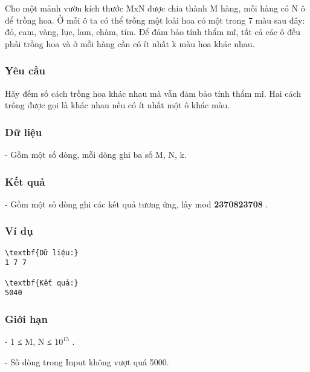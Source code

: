 







   Cho một mảnh vườn kích thước MxN được chia thành M hàng, mỗi hàng có N ô để trồng hoa. Ở mỗi ô ta có thể trồng một loài hoa có một trong 7 màu sau đây: đỏ, cam, vàng, lục, lam, chàm, tím. Để đảm bảo tính thẩm mĩ, tất cả các ô đều phải trồng hoa và ở mỗi hàng cần có ít nhất k màu hoa khác nhau.  

\subsubsection{   Yêu cầu  }

   Hãy đếm số cách trồng hoa khác nhau mà vẫn đảm bảo tính thẩm mĩ. Hai cách trồng được gọi là khác nhau nếu có ít nhất một ô khác màu.  

\subsubsection{   Dữ liệu  }

   - Gồm một số dòng, mỗi dòng ghi ba số M, N, k.  

\subsubsection{   Kết quả  }

   - Gồm một số dòng ghi các kết quả tương ứng, lấy mod   \textbf{    2370823708   }   .  

\subsubsection{   Ví dụ  }
\begin{verbatim}
\textbf{Dữ liệu:}
1 7 7

\textbf{Kết quả:}
5040
\end{verbatim}

\subsubsection{   Giới hạn  }

   - 1 ≤ M, N ≤ $10^{15}$   .   


   - Số dòng trong Input không vượt quá 5000.  

